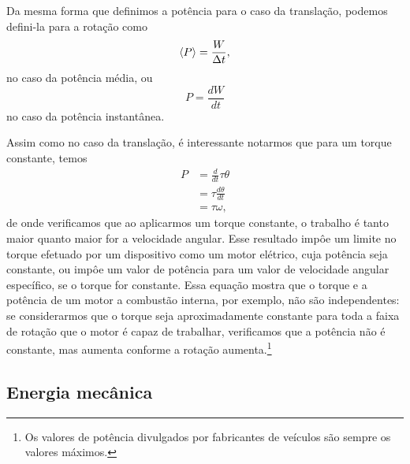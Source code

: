 Da mesma forma que definimos a potência para o caso da translação, podemos defini-la para a rotação como
\begin{equation}
    \left\langle{P}\right\rangle = \frac{W}{\Delta t},
\end{equation}
%
no caso da potência média, ou
\begin{equation}
    P = \frac{dW}{dt}
\end{equation}
%
no caso da potência instantânea.

Assim como no caso da translação, é interessante notarmos que para um torque constante, temos
\begin{align}
    P &= \frac{d}{dt} \tau \theta \\
    &= \tau \frac{d\theta}{dt} \\
    &= \tau \omega,
\end{align}
%
de onde verificamos que ao aplicarmos um torque constante, o trabalho é tanto maior quanto maior for a velocidade angular. Esse resultado impôe um limite no torque efetuado por um dispositivo como um motor elétrico, cuja potência seja constante, ou impôe um valor de potência para um valor de velocidade angular específico, se o torque for constante. Essa equação mostra que o torque e a potência de um motor a combustão interna, por exemplo, não são independentes: se considerarmos que o torque seja aproximadamente constante para toda a faixa de rotação que o motor é capaz de trabalhar, verificamos que a potência não é constante, mas aumenta conforme a rotação aumenta.\footnote{Os valores de potência divulgados por fabricantes de veículos são sempre os valores máximos.}



\subsection{Energia mecânica}

